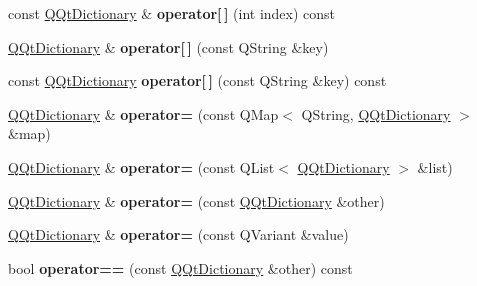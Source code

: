 \begin{DoxyCompactItemize}
const \mbox{\hyperlink{class_q_qt_dictionary}{Q\+Qt\+Dictionary}} \& {\bfseries operator\mbox{[}$\,$\mbox{]}} (int index) const
\item 
\mbox{\label{class_q_qt_dictionary_a14a0084db18267a1eec302ed79ca99ad}} 
\mbox{\hyperlink{class_q_qt_dictionary}{Q\+Qt\+Dictionary}} \& {\bfseries operator\mbox{[}$\,$\mbox{]}} (const Q\+String \&key)
\item 
\mbox{\label{class_q_qt_dictionary_a4308785c7eda6cc9abe8f53c1938eaa5}} 
const \mbox{\hyperlink{class_q_qt_dictionary}{Q\+Qt\+Dictionary}} {\bfseries operator\mbox{[}$\,$\mbox{]}} (const Q\+String \&key) const
\item 
\mbox{\label{class_q_qt_dictionary_a11389a81fe4b50f84f685cfe969f8d0a}} 
\mbox{\hyperlink{class_q_qt_dictionary}{Q\+Qt\+Dictionary}} \& {\bfseries operator=} (const Q\+Map$<$ Q\+String, \mbox{\hyperlink{class_q_qt_dictionary}{Q\+Qt\+Dictionary}} $>$ \&map)
\item 
\mbox{\label{class_q_qt_dictionary_a89070c4531124d6d0aa9f310f9364748}} 
\mbox{\hyperlink{class_q_qt_dictionary}{Q\+Qt\+Dictionary}} \& {\bfseries operator=} (const Q\+List$<$ \mbox{\hyperlink{class_q_qt_dictionary}{Q\+Qt\+Dictionary}} $>$ \&list)
\item 
\mbox{\label{class_q_qt_dictionary_ab51cac1112393bc13ea3b8424b028035}} 
\mbox{\hyperlink{class_q_qt_dictionary}{Q\+Qt\+Dictionary}} \& {\bfseries operator=} (const \mbox{\hyperlink{class_q_qt_dictionary}{Q\+Qt\+Dictionary}} \&other)
\item 
\mbox{\label{class_q_qt_dictionary_a2f56c114e86ff37d43d926538bc4d3a2}} 
\mbox{\hyperlink{class_q_qt_dictionary}{Q\+Qt\+Dictionary}} \& {\bfseries operator=} (const Q\+Variant \&value)
\item 
\mbox{\label{class_q_qt_dictionary_a2454a484f96f28bb7ab5b823111f9474}} 
bool {\bfseries operator==} (const \mbox{\hyperlink{class_q_qt_dictionary}{Q\+Qt\+Dictionary}} \&other) const
\item 
\mbox{\label{class_q_qt_dictionary_a108ec31dc21d0bac5882f132765d7936}} 

\end{DoxyCompactItemize}
